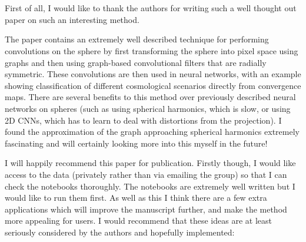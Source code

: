 \documentclass[12pt,a4paper]{article}
\newcommand{\todo}[1]{{\color[rgb]{.6,.1,.6}{TODO: #1}}}
\newcommand{\1}{\b{1}}              %
\newcommand{\0}{\b{0}}              %
\begin{document}
\section{}

\begin{mdframed}[style=comment] 
First of all, I would like to thank the authors for writing such a well thought out paper on such an interesting method.

The paper contains an extremely well described technique for performing convolutions on the sphere by first transforming the sphere into pixel space using graphs and then using graph-based convolutional filters that are radially symmetric. These convolutions are then used in neural networks, with an example showing classification of different cosmological scenarios directly from convergence maps. There are several benefits to this method over previously described neural networks on spheres (such as using spherical harmonics, which is slow, or using 2D CNNs, which has to learn to deal with distortions from the projection). I found the approximation of the graph approaching spherical harmonics extremely fascinating and will certainly looking more into this myself in the future!

I will happily recommend this paper for publication. Firstly though, I would like access to the data (privately rather than via emailing the group) so that I can check the notebooks thoroughly. The notebooks are extremely well written but I would like to run them first. As well as this I think there are a few extra applications which will improve the manuscript further, and make the method more appealing for users. I would recommend that these ideas are at least seriously considered by the authors and hopefully implemented: 
\end{mdframed}

\todo{Assigned @Tomek
\begin{itemize}
  \item Thank the reviewer
  \item give him access to data
\end{itemize}}

\subsection{}
\end{document}
